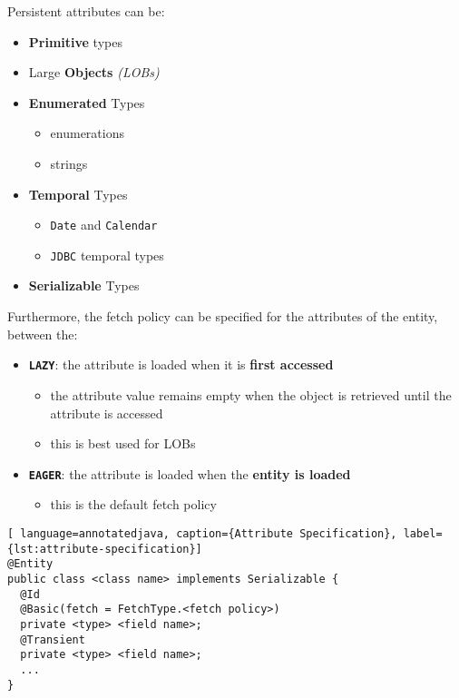 \documentclass[english]{article}
\begin{document}
Persistent attributes can be:

\begin{itemize}
  \item \textbf{Primitive} types
  \item Large \textbf{Objects} \textit{(LOBs)}
  \item \textbf{Enumerated} Types
        \begin{itemize}
          \item \java enumerations
          \item strings
        \end{itemize}
  \item \textbf{Temporal} Types
        \begin{itemize}
          \item \java \texttt{Date} and \texttt{Calendar}
          \item \texttt{JDBC} temporal types
        \end{itemize}
  \item \textbf{Serializable} Types
\end{itemize}

Furthermore, the fetch policy can be specified for the attributes of the entity, between the:

\begin{itemize}
  \item \textbf{\texttt{LAZY}}: the attribute is loaded when it is \textbf{first accessed}
        \begin{itemize}
          \item the attribute value remains empty when the object is retrieved until the attribute is accessed
          \item this is best used for LOBs
        \end{itemize}
  \item \textbf{\texttt{EAGER}}: the attribute is loaded when the \textbf{entity is loaded}
        \begin{itemize}
          \item this is the default fetch policy
        \end{itemize}
\end{itemize}

\begin{lstlisting}[ language=annotatedjava, caption={Attribute Specification}, label={lst:attribute-specification}]
@Entity
public class <class name> implements Serializable {
  @Id
  @Basic(fetch = FetchType.<fetch policy>)
  private <type> <field name>;
  @Transient
  private <type> <field name>;
  ...
}
\end{lstlisting}
\end{document}
